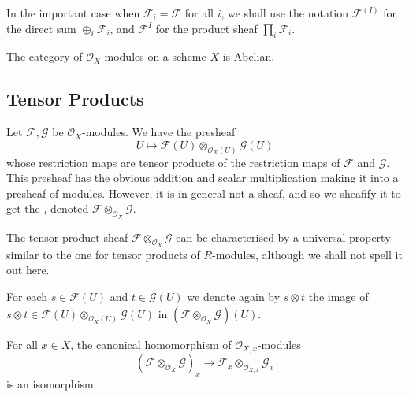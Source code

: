 In the important case when $\mathcal{F}_i = \mathcal{F}$ for all $i$, we shall use the notation $\mathcal{F}^{(I)}$ for the direct sum $\oplus_i \mathcal{F}_i$, and $\mathcal{F}^I$ for the product sheaf $\prod_i \mathcal{F}_i$.



\begin{theorem}
	The category of $\mathcal{O}_X$-modules on a scheme $X$ is Abelian.
\end{theorem}

\subsection*{Tensor Products}

Let $\mathcal{F}, \mathcal{G}$ be $\mathcal{O}_X$-modules. We have the presheaf
\begin{equation*}
	U \mapsto \mathcal{F}(U) \otimes_{\mathcal{O}_X(U)} \mathcal{G}(U)
\end{equation*}
whose restriction maps are tensor products of the restriction maps of $\mathcal{F}$ and $\mathcal{G}$. This presheaf has the obvious addition and scalar multiplication making it into a presheaf of modules. However, it is in general not a sheaf, and so we sheafify it to get the , denoted $\mathcal{F} \otimes_{\mathcal{O}_X}\mathcal{G}$.

\begin{remark}
	The tensor product sheaf $\mathcal{F} \otimes_{\mathcal{O}_X}\mathcal{G}$ can be characterised by a universal property similar to the one for tensor products of $R$-modules, although we shall not spell it out here.
\end{remark}

For each $s \in \mathcal{F}(U)$ and $t \in \mathcal{G}(U)$ we denote again by $s \otimes t$ the image of $s \otimes t \in \mathcal{F}(U) \otimes_{\mathcal{O}_X(U)} \mathcal{G}(U)$ in $(\mathcal{F} \otimes_{\mathcal{O}_X}\mathcal{G}) (U)$. 

\begin{proposition}
	For all $x \in X$, the canonical homomorphism of $\mathcal{O}_{X, x}$-modules
	\begin{equation*}
		(\mathcal{F} \otimes_{\mathcal{O}_X}\mathcal{G})_x \to \mathcal{F}_x \otimes_{\mathcal{O}_{X, x}}\mathcal{G}_x
	\end{equation*}
	is an isomorphism.
\end{proposition}

